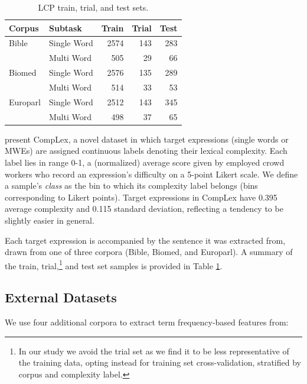 \documentclass[11pt,a4paper]{article}
\begin{document}
\begin{table}
  \centering
  \begin{tabular}{l|l|r|r|r}
    \toprule
    \centering
    Corpus & Subtask & Train &  Trial &  Test \\
    \midrule
    Bible & Single Word &   2574 &    143 &   283 \\
            & Multi Word &    505 &     29 &    66 \\
    \midrule
    Biomed & Single Word &   2576 &    135 &   289 \\
            & Multi Word &    514 &     33 &    53 \\
    \midrule
    Europarl & Single Word &   2512 &    143 &   345 \\
            & Multi Word &    498 &     37 &    65 \\
    \bottomrule
  \end{tabular}
  \caption{\label{tab:datasets} LCP train, trial, and test sets.}
\end{table}

\citet{shardlow2020complex} present CompLex, a novel dataset in which target expressions (single words or MWEs) are assigned continuous labels denoting their lexical complexity. Each label lies in range 0-1, a (normalized) average score given by employed crowd workers who record an expression's difficulty on a 5-point Likert scale. We define a sample's \textit{class} as the bin to which its complexity label belongs (bins corresponding to Likert points). Target expressions in CompLex have 0.395 average complexity and 0.115 standard deviation, reflecting a tendency to be slightly easier in general. 

Each target expression is accompanied by the sentence it was extracted from, drawn from one of three corpora (Bible, Biomed, and Europarl). A summary of the train, trial,\footnote{In our study we avoid the trial set as we find it to be less representative of the training data, opting instead for training set cross-validation, stratified by corpus and complexity label.} and test set samples is provided in Table \ref{tab:datasets}.

\subsection{External Datasets}

We use four additional corpora to extract term frequency-based features from:
\end{document}
